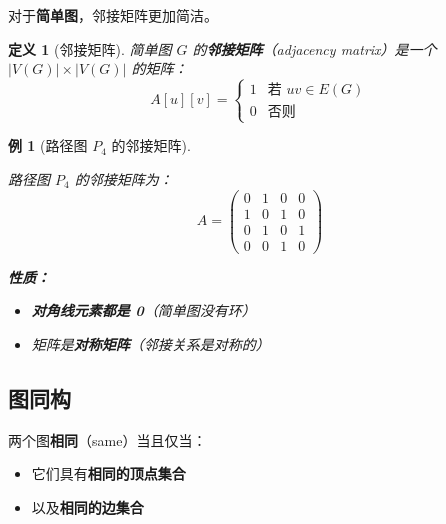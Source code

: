 \documentclass[12pt, a4paper]{article}
\newtheorem{definition}{定义}[section]
\newtheorem{example}{例}[section]
\begin{document}
对于\textbf{简单图}，邻接矩阵更加简洁。

\begin{definition}[邻接矩阵]
简单图 $G$ 的\textbf{邻接矩阵}（adjacency matrix）是一个 $|V(G)| \times |V(G)|$ 的矩阵：
\[
A[u][v] = \begin{cases}
1 & \text{若 } uv \in E(G) \\
0 & \text{否则}
\end{cases}
\]
\end{definition}

\begin{example}[路径图 $P_4$ 的邻接矩阵]

\begin{center}
\end{center}

路径图 $P_4$ 的邻接矩阵为：
\[
A = \begin{pmatrix}
0 & 1 & 0 & 0 \\
1 & 0 & 1 & 0 \\
0 & 1 & 0 & 1 \\
0 & 0 & 1 & 0
\end{pmatrix}
\]

\textbf{性质：}
\begin{itemize}
    \item \textbf{对角线元素都是 0}（简单图没有环）
    \item 矩阵是\textbf{对称矩阵}（邻接关系是对称的）
\end{itemize}
\end{example}


\newpage
\subsection{图同构}

两个图\textbf{相同}（same）当且仅当：
\begin{itemize}
    \item 它们具有\textbf{相同的顶点集合}
    \item 以及\textbf{相同的边集合}
\end{itemize}
\end{document}
